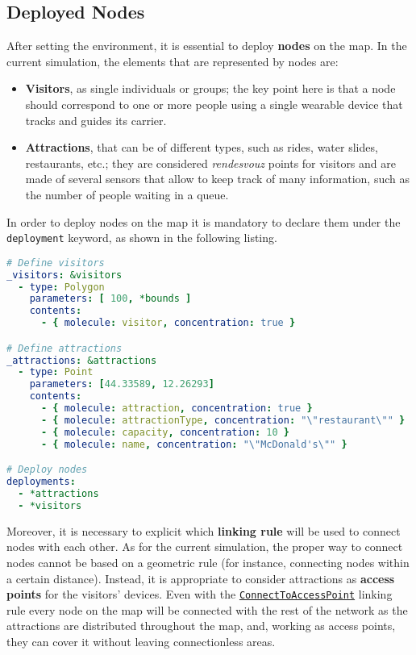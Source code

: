 \subsection{Deployed Nodes}
After setting the environment, it is essential to deploy \textbf{nodes} on the map. In the current simulation, the elements that are represented by nodes are:
\begin{itemize}
    \item \textbf{Visitors}, as single individuals or groups; the key point here is that a node should correspond to one or more people using a single wearable device that tracks and guides its carrier.
    \item \textbf{Attractions}, that can be of different types, such as rides, water slides, restaurants, etc.; they are considered \textit{rendesvouz} points for visitors and are made of several sensors that allow to keep track of many information, such as the number of people waiting in a queue.
\end{itemize}

\noindent
In order to deploy nodes on the map it is mandatory to declare them under the \texttt{deployment} keyword, as shown in the following listing.

\begin{lstlisting}[language=yaml, label=code:deployment, caption=Deploying 1 attraction and 100 visitors inside the \texttt{bounds} polygon.]
# Define visitors
_visitors: &visitors
  - type: Polygon
    parameters: [ 100, *bounds ]
    contents:
      - { molecule: visitor, concentration: true }

# Define attractions
_attractions: &attractions
  - type: Point
    parameters: [44.33589, 12.26293]
    contents:
      - { molecule: attraction, concentration: true }
      - { molecule: attractionType, concentration: "\"restaurant\"" }
      - { molecule: capacity, concentration: 10 }
      - { molecule: name, concentration: "\"McDonald's\"" }

# Deploy nodes
deployments:
  - *attractions
  - *visitors
\end{lstlisting}

\noindent
Moreover, it is necessary to explicit which \textbf{linking rule} will be used to connect nodes with each other. As for the current simulation, the proper way to connect nodes cannot be based on a geometric rule (for instance, connecting nodes within a certain distance). Instead, it is appropriate to consider attractions as \textbf{access points} for the visitors' devices. Even with the \href{https://alchemistsimulator.github.io/reference/kdoc/alchemist/it.unibo.alchemist.model.implementations.linkingrules/-connect-to-access-point/index.html}{\texttt{ConnectToAccessPoint}} linking rule every node on the map will be connected with the rest of the network as the attractions are distributed throughout the map, and, working as access points, they can cover it without leaving connectionless areas.

